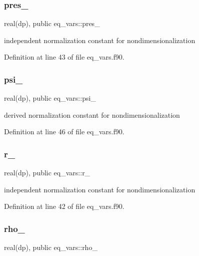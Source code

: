 \subsubsection{\texorpdfstring{pres\+\_}{pres\_0}}
{\footnotesize\ttfamily real(dp), public eq\+\_\+vars\+::pres\+\_}



independent normalization constant for nondimensionalization 



Definition at line 43 of file eq\+\_\+vars.\+f90.

\mbox{\label{namespaceeq__vars_a2bb2594492faa83869c3eaf8cabe521e}} 
\subsubsection{\texorpdfstring{psi\+\_}{psi\_0}}
{\footnotesize\ttfamily real(dp), public eq\+\_\+vars\+::psi\+\_}



derived normalization constant for nondimensionalization 



Definition at line 46 of file eq\+\_\+vars.\+f90.

\mbox{\label{namespaceeq__vars_a0c1f124ab3260a0f6937df9189a18184}} 
\subsubsection{\texorpdfstring{r\+\_}{r\_0}}
{\footnotesize\ttfamily real(dp), public eq\+\_\+vars\+::r\+\_}



independent normalization constant for nondimensionalization 



Definition at line 42 of file eq\+\_\+vars.\+f90.

\mbox{\label{namespaceeq__vars_a8c9bdb18a418329b9be241342ea704e3}} 
\subsubsection{\texorpdfstring{rho\+\_}{rho\_0}}
{\footnotesize\ttfamily real(dp), public eq\+\_\+vars\+::rho\+\_}



